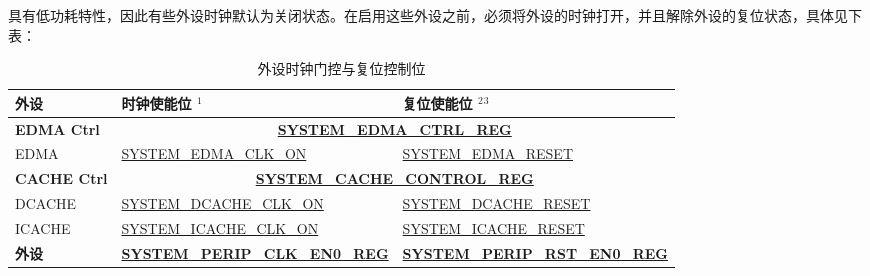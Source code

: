 \documentclass[main\_\_CN.tex]{subfiles}
\begin{document}
\chipname{} 具有低功耗特性，因此有些外设时钟默认为关闭状态。在启用这些外设之前，必须将外设的时钟打开，并且解除外设的复位状态，具体见下表：

\begin{longtable}[c]{ |p{4cm}|p{6cm}|p{6cm}| }
\caption{外设时钟门控与复位控制位}
\label{tab:sysreg-peripheral-controlling-bit}
\\\hline\rowcolor{lightgray}
外设    & 时钟使能位 {\hyperref[other:sysreg-reset-notes]{$^1$}} & 复位使能位 {\hyperref[other:sysreg-reset-notes]{$^2$}}{\hyperref[other:sysreg-reset-notes]{$^3$}}\\\hline

\textbf{EDMA Ctrl} & \multicolumn{2}{|c|}{\textbf{\hyperref[regdesc:SYSTEMEDMACTRLREG]{SYSTEM\_EDMA\_CTRL\_REG}}}\\\hline
EDMA & \hyperref[fielddesc:SYSTEMEDMACLKON]{SYSTEM\_EDMA\_CLK\_ON} & \hyperref[fielddesc:SYSTEMEDMARESET]{SYSTEM\_EDMA\_RESET}  \\\hline

\textbf{CACHE Ctrl} & \multicolumn{2}{|c|}{\textbf{\hyperref[regdesc:SYSTEMCACHECONTROLREG]{SYSTEM\_CACHE\_CONTROL\_REG}}}\\\hline
DCACHE & \hyperref[fielddesc:SYSTEMDCACHECLKON]{SYSTEM\_DCACHE\_CLK\_ON} & \hyperref[fielddesc:SYSTEMDCACHERESET]{SYSTEM\_DCACHE\_RESET} \\\hline
ICACHE & \hyperref[fielddesc:SYSTEMICACHECLKON]{SYSTEM\_ICACHE\_CLK\_ON} & \hyperref[fielddesc:SYSTEMICACHERESET]{SYSTEM\_ICACHE\_RESET} \\\hline

\textbf{外设} & \textbf{\hyperref[regdesc:SYSTEMPERIPCLKEN0REG]{SYSTEM\_PERIP\_CLK\_EN0\_REG}} & \textbf{\hyperref[regdesc:SYSTEMPERIPRSTEN0REG]{SYSTEM\_PERIP\_RST\_EN0\_REG}} \\ \hline


\end{longtable}
\end{document}
